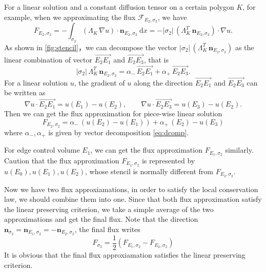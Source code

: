 \documentclass[times,review,preprint,authoryear]{elsarticle}
\newcommand{\bn}{\mathbf{n}}
\begin{document}
For a linear solution and a constant diffusion tensor on a certain polygon $K$, for example, when we approximating the flux $\mathcal{F}_{E_{2}, \sigma_{2}}$, we have
\begin{equation}
F_{E_{2}, \sigma_{2}} = - \int_{\sigma_{2}} (\Lambda_K \, \nabla u) \cdot \bn_{E_{2}, \sigma_{2}} \ \mathrm{d}x = - |\sigma_{2}| \, (\Lambda_K^T \, \bn_{E_{2}, \sigma_{2}}) \cdot \nabla u.
\end{equation}
As shown in \cref{fig:stencil}，we can decompose the vector $|\sigma_{2}| \, (\Lambda_K^T \, \bn_{E_{2}, \sigma_{2}})$ as the linear combination of vector $\overrightarrow{E_{2} E_{1}}$ and $\overrightarrow{E_{2} E_{3}}$, that is
\begin{equation}\label{eq:dcomp}
|\sigma_{2}| \, \Lambda_K^T \, \bn_{E_{2}, \sigma_{2}} = \alpha_{-} \, \overrightarrow{E_{2} E_{1}} + \alpha_{+} \, \overrightarrow{E_{2} E_{3}}.
\end{equation}
For a linear solution $u$, the gradient of $u$ along the direction  $\overrightarrow{E_{2} E_{1}}$ and $\overrightarrow{E_{2} E_{3}}$ can be written as
\begin{equation*}
\nabla u \cdot \overrightarrow{E_{2} E_{1}} = u(E_{1}) - u(E_{2}), \qquad \nabla u \cdot \overrightarrow{E_{2} E_{3}} = u(E_{3}) - u(E_{2}).
\end{equation*}
Then we can get the flux approximation for piece-wise linear solution
\begin{equation*}
F_{E_{2}, \sigma_{2}} = \alpha_{-} \, (u(E_{2}) - u(E_{1})) + \alpha_{+} \, (E_{2}) - u(E_{3})
\end{equation*}
where $\alpha_{-}, \alpha_{+}$ is given by vector decomposition \cref{eq:dcomp}.

For edge control volume $E_{1}$, we can get the flux approximation $F_{E_{1}, \sigma_{2}}$ similarly. Caution that the flux approximation $F_{E_{1}, \sigma_{2}}$ is represented by $u(E_{0}), u(E_{1}), u(E_{2})$, whose stencil is normally different from $F_{E_{2}, \sigma_{2}}$.

Now we have two flux approxiamations, in order to satisfy the local conservation law, we should combine them into one. Since that both flux approximation satisfy the linear preserving criterion, we take a simple average of the two approximations and get the final flux. Note that the direction $\bn_{\sigma_{2}} = \bn_{E_{1}, \sigma_{2}} = - \bn_{E_{2}, \sigma_{2}}$, the final flux writes
\begin{equation*}
F_{\sigma_{2}} = \frac12 (F_{E_{1}, \sigma_{2}} - F_{E_{2}, \sigma_{2}})
\end{equation*}
It is obvious that the final flux approxiamation satisfies the linear preserving criterion.
\end{document}
